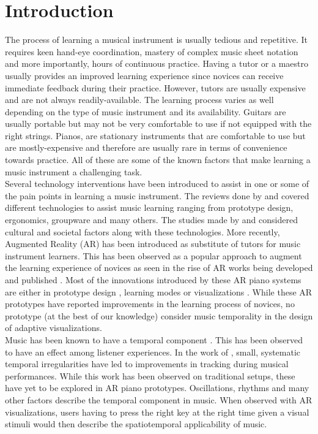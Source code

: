 \documentclass[manuscript,screen]{acmart}
\begin{document}
\section{Introduction}
The process of learning a musical instrument is usually tedious and repetitive. It requires keen hand-eye coordination, mastery of complex music sheet notation and more importantly, hours of continuous practice. Having a tutor or a maestro usually provides an improved learning experience since novices can receive immediate feedback during their practice. However, tutors are usually expensive and are not always readily-available. The learning process varies as well depending on the type of music instrument and its availability. Guitars are usually portable but may not be very comfortable to use if not equipped with the right strings. Pianos, are stationary instruments that are comfortable to use but are mostly-expensive and therefore are usually rare in terms of convenience towards practice. All of these are some of the known factors that make learning a music instrument a challenging task.\\

Several technology interventions have been introduced to assist in one or some of the pain points in learning a music instrument. The reviews done by \citet{fober2007vemus} and \citet{daniel2006exploring} covered different technologies to assist music learning ranging from prototype design, ergonomics, groupware and many others. The studies made by \citet{creech2010learning} and \citet{cope1997cultural} considered cultural and societal factors along with these technologies. More recently, Augmented Reality (AR) has been introduced as substitute of tutors for music instrument learners. This has been observed as a popular approach to augment the learning experience of novices as seen in the rise of AR works being developed and published  \cite{santos2013augmented}. Most of the innovations introduced by these AR piano systems are either in prototype design \cite{barakonyi2005augmented, huang2011piano}, learning modes \cite{rogers2014piano} or visualizations \cite{chow2013music}. While these AR prototypes have reported improvements in the learning process of novices, no prototype (at the best of our knowledge) consider music temporality in the design of adaptive visualizations. \\

Music has been known to have a temporal component \cite{lippman1984progressive}. This has been observed to have an effect among listener experiences. In the work of \citet{large2002perceiving}, small, systematic temporal irregularities have led to improvements in tracking during musical performances. While this work has been observed on traditional setups, these have yet to be explored in AR piano prototypes. Oscillations, rhythms and many other factors describe the temporal component in music. When observed with AR visualizations, users having to press the right key at the right time given a visual stimuli would then describe the spatiotemporal applicability of music.\\
\end{document}
